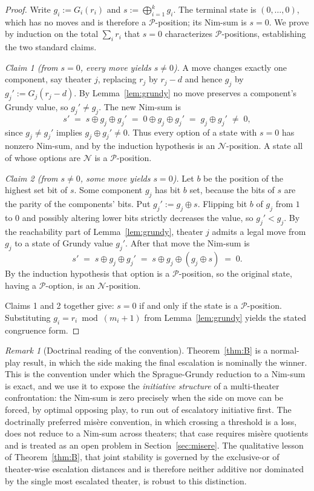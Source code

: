 \documentclass[11pt]{article}
\theoremstyle{plain}
\theoremstyle{definition}
\theoremstyle{remark}
\newtheorem{remark}[theorem]{Remark}
\begin{document}
\begin{proof}
Write $g_i := G_i(r_i)$ and $s := \bigoplus_{i=1}^{k} g_i$. The terminal
state is $(0,\dots,0)$, which has no moves and is therefore a
$\mathcal{P}$-position; its Nim-sum is $s=0$. We prove by induction on the
total $\sum_i r_i$ that $s=0$ characterizes $\mathcal{P}$-positions,
establishing the two standard claims.

\emph{Claim 1 (from $s=0$, every move yields $s\neq 0$).}
A move changes exactly one component, say theater $j$, replacing $r_j$ by
$r_j-d$ and hence $g_j$ by $g_j':=G_j(r_j-d)$. By Lemma~\ref{lem:grundy} no
move preserves a component's Grundy value, so $g_j'\neq g_j$. The new
Nim-sum is
\[
  s' \;=\; s \oplus g_j \oplus g_j' \;=\; 0 \oplus g_j \oplus g_j'
       \;=\; g_j \oplus g_j' \;\neq\; 0,
\]
since $g_j\neq g_j'$ implies $g_j\oplus g_j'\neq 0$. Thus every option of a
state with $s=0$ has nonzero Nim-sum, and by the induction hypothesis is
an $\mathcal{N}$-position. A state all of whose options are
$\mathcal{N}$ is a $\mathcal{P}$-position.

\emph{Claim 2 (from $s\neq 0$, some move yields $s=0$).}
Let $b$ be the position of the highest set bit of $s$. Some component $g_j$
has bit $b$ set, because the bits of $s$ are the parity of the components'
bits. Put $g_j' := g_j \oplus s$. Flipping bit $b$ of $g_j$ from $1$ to $0$
and possibly altering lower bits strictly decreases the value, so
$g_j' < g_j$. By the reachability part of Lemma~\ref{lem:grundy}, theater
$j$ admits a legal move from $g_j$ to a state of Grundy value $g_j'$.
After that move the Nim-sum is
\[
  s' \;=\; s \oplus g_j \oplus g_j'
       \;=\; s \oplus g_j \oplus (g_j \oplus s) \;=\; 0 .
\]
By the induction hypothesis that option is a $\mathcal{P}$-position, so the
original state, having a $\mathcal{P}$-option, is an
$\mathcal{N}$-position.

Claims 1 and 2 together give: $s=0$ if and only if the state is a
$\mathcal{P}$-position. Substituting $g_i=r_i\bmod(m_i+1)$ from
Lemma~\ref{lem:grundy} yields the stated congruence form.
\end{proof}

\begin{remark}[Doctrinal reading of the convention]\label{rem:normal}
Theorem~\ref{thm:B} is a normal-play result, in which the side making the
final escalation is nominally the winner. This is the convention under which
the Sprague-Grundy reduction to a Nim-sum is exact, and we use it to expose
the \emph{initiative structure} of a multi-theater confrontation: the
Nim-sum is zero precisely when the side on move can be forced, by optimal
opposing play, to run out of escalatory initiative first. The doctrinally
preferred mis\`ere convention, in which crossing a threshold is a loss, does
not reduce to a Nim-sum across theaters; that case requires mis\`ere quotients
\citep{plambeck2005, plambecksiegel2008} and is treated as an open problem
in Section~\ref{sec:misere}. The qualitative lesson of Theorem~\ref{thm:B},
that joint stability is governed by the exclusive-or of theater-wise
escalation distances and is therefore neither additive nor dominated by the
single most escalated theater, is robust to this distinction.
\end{remark}
\end{document}
